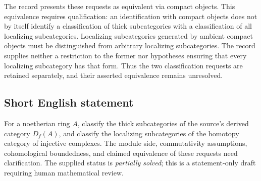 \documentclass[11pt]{article}
\begin{document}
The record presents these requests as equivalent via compact objects. This equivalence requires qualification: an identification with compact objects does not by itself identify a classification of thick subcategories with a classification of all localizing subcategories. Localizing subcategories generated by ambient compact objects must be distinguished from arbitrary localizing subcategories. The record supplies neither a restriction to the former nor hypotheses ensuring that every localizing subcategory has that form. Thus the two classification requests are retained separately, and their asserted equivalence remains unresolved.
\subsection{Short English statement}
For a noetherian ring \(A\), classify the thick subcategories of the source's derived category \(D_f(A)\), and classify the localizing subcategories of the homotopy category of injective complexes. The module side, commutativity assumptions, cohomological boundedness, and claimed equivalence of these requests need clarification. The supplied status is \emph{partially solved}; this is a statement-only draft requiring human mathematical review.
\end{document}
